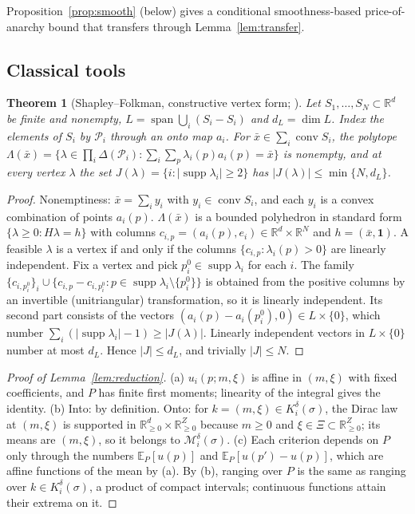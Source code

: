 \documentclass[preprint,11pt]{elsarticle}
\newtheorem{theorem}{Theorem}
\theoremstyle{definition}
\theoremstyle{remark}
\newcommand{\R}{\mathbb{R}}
\newcommand{\E}{\mathbb{E}}
\newcommand{\cP}{\mathcal{P}}
\newcommand{\cM}{\mathcal{M}}
\newcommand{\conv}{\operatorname{conv}}
\newcommand{\spn}{\operatorname{span}}
\newcommand{\supp}{\operatorname{supp}}
\begin{document}
Proposition~\ref{prop:smooth} (below) gives a conditional smoothness-based price-of-anarchy bound that transfers through Lemma~\ref{lem:transfer}.


\subsection{Classical tools}

\begin{theorem}[Shapley--Folkman, constructive vertex form; \citealp{Starr1969}]\label{thm:sf}
Let $S_1,\dots,S_N\subset\R^d$ be finite and nonempty, $L=\spn\bigcup_i(S_i-S_i)$ and $d_L=\dim L$. Index the elements of $S_i$ by $\cP_i$ through an onto map $a_i$. For $\bar x\in\sum_i\conv S_i$, the polytope $\Lambda(\bar x)=\{\lambda\in\prod_i\Delta(\cP_i):\sum_i\sum_p\lambda_i(p)a_i(p)=\bar x\}$ is nonempty, and at every vertex $\lambda$ the set $J(\lambda)=\{i:|\supp\lambda_i|\ge2\}$ has $|J(\lambda)|\le\min\{N,d_L\}$.
\end{theorem}
\begin{proof}
Nonemptiness: $\bar x=\sum_iy_i$ with $y_i\in\conv S_i$, and each $y_i$ is a convex combination of points $a_i(p)$. $\Lambda(\bar x)$ is a bounded polyhedron in standard form $\{\lambda\ge0:H\lambda=h\}$ with columns $c_{i,p}=(a_i(p),e_i)\in\R^d\times\R^N$ and $h=(\bar x,\mathbf 1)$. A feasible $\lambda$ is a vertex if and only if the columns $\{c_{i,p}:\lambda_i(p)>0\}$ are linearly independent. Fix a vertex and pick $p_i^0\in\supp\lambda_i$ for each $i$. The family $\{c_{i,p_i^0}\}_i\cup\{c_{i,p}-c_{i,p_i^0}:p\in\supp\lambda_i\setminus\{p_i^0\}\}$ is obtained from the positive columns by an invertible (unitriangular) transformation, so it is linearly independent. Its second part consists of the vectors $(a_i(p)-a_i(p_i^0),0)\in L\times\{0\}$, which number $\sum_i(|\supp\lambda_i|-1)\ge|J(\lambda)|$. Linearly independent vectors in $L\times\{0\}$ number at most $d_L$. Hence $|J|\le d_L$, and trivially $|J|\le N$.
\end{proof}

\begin{proof}[Proof of Lemma~\ref{lem:reduction}]
(a) $u_i(p;m,\xi)$ is affine in $(m,\xi)$ with fixed coefficients, and $P$ has finite first moments; linearity of the integral gives the identity. (b) Into: by definition. Onto: for $k=(m,\xi)\in K_i^\delta(\sigma)$, the Dirac law at $(m,\xi)$ is supported in $\R^d_{\ge0}\times\R^Z_{\ge0}$ because $m\ge0$ and $\xi\in\Xi\subset\R^Z_{\ge0}$; its means are $(m,\xi)$, so it belongs to $\cM_i^\delta(\sigma)$. (c) Each criterion depends on $P$ only through the numbers $\E_P[u(p)]$ and $\E_P[u(p')-u(p)]$, which are affine functions of the mean by (a). By (b), ranging over $P$ is the same as ranging over $k\in K_i^\delta(\sigma)$, a product of compact intervals; continuous functions attain their extrema on it.
\end{proof}
\end{document}
